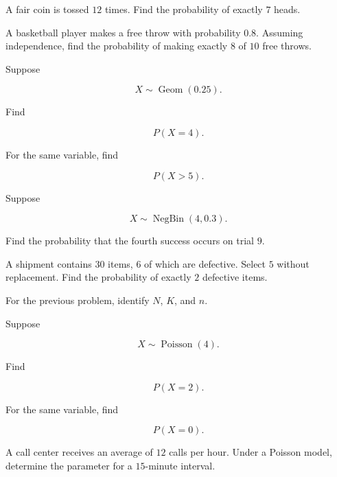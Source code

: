 \begin{exercise}[2]
A fair coin is tossed \(12\) times. Find the probability of exactly
\(7\) heads.
\end{exercise}

\begin{exercise}[2]
A basketball player makes a free throw with probability \(0.8\).
Assuming independence, find the probability of making exactly \(8\) of
\(10\) free throws.
\end{exercise}

\begin{exercise}[2]
Suppose

\[
X\sim\operatorname{Geom}(0.25).
\]

Find

\[
P(X=4).
\]
\end{exercise}

\begin{exercise}[2]
For the same variable, find

\[
P(X>5).
\]
\end{exercise}

\begin{exercise}[2]
Suppose

\[
X\sim\operatorname{NegBin}(4,0.3).
\]

Find the probability that the fourth success occurs on trial \(9\).
\end{exercise}

\begin{exercise}[2]
A shipment contains \(30\) items, \(6\) of which are defective. Select
\(5\) without replacement. Find the probability of exactly \(2\)
defective items.
\end{exercise}

\begin{exercise}[2]
For the previous problem, identify \(N\), \(K\), and \(n\).
\end{exercise}

\begin{exercise}[2]
Suppose

\[
X\sim\operatorname{Poisson}(4).
\]

Find

\[
P(X=2).
\]
\end{exercise}

\begin{exercise}[2]
For the same variable, find

\[
P(X=0).
\]
\end{exercise}

\begin{exercise}[2]
A call center receives an average of \(12\) calls per hour. Under a
Poisson model, determine the parameter for a \(15\)-minute interval.
\end{exercise}

